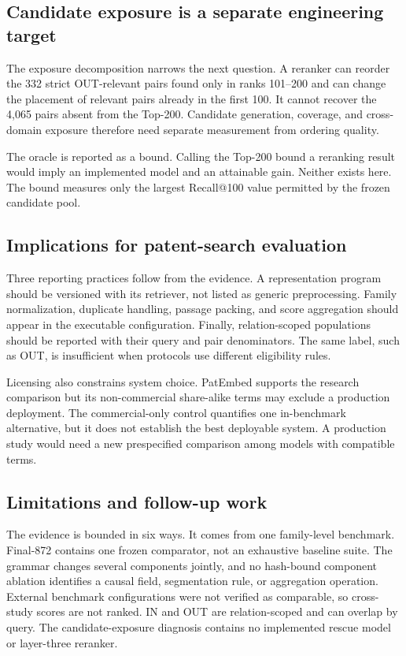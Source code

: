 \documentclass[final,5p,times,twocolumn]{elsarticle}
\begin{document}
\subsection{Candidate exposure is a separate engineering target}

The exposure decomposition narrows the next question. A reranker can reorder the
332 strict OUT-relevant pairs found only in ranks 101--200 and can change the
placement of relevant pairs already in the first 100. It cannot recover the
4,065 pairs absent from the Top-200. Candidate generation, coverage, and
cross-domain exposure therefore need separate measurement from ordering
quality.

The oracle is reported as a bound. Calling the Top-200 bound a reranking result
would imply an implemented model and an
attainable gain. Neither exists here. The bound measures only the largest
Recall@100 value permitted by the frozen candidate pool.

\subsection{Implications for patent-search evaluation}

Three reporting practices follow from the evidence. A representation program
should be versioned with its retriever, not listed as generic preprocessing.
Family normalization, duplicate handling, passage packing, and score
aggregation should appear in the executable configuration. Finally,
relation-scoped populations should be reported with their query and pair
denominators. The same label, such as OUT, is insufficient when protocols use
different eligibility rules.

Licensing also constrains system choice. PatEmbed supports the research
comparison but its non-commercial share-alike terms may exclude a production
deployment. The commercial-only control quantifies one in-benchmark
alternative, but it does not establish the best deployable system. A
production study would need a new prespecified comparison among models with
compatible terms.

\subsection{Limitations and follow-up work}

The evidence is bounded in six ways. It comes from one family-level benchmark.
Final-872 contains one frozen comparator, not an exhaustive baseline suite. The
grammar changes several components jointly, and no hash-bound component
ablation identifies a causal field, segmentation rule, or aggregation
operation. External benchmark configurations were not verified as comparable,
so cross-study scores are not ranked. IN and OUT are relation-scoped and can
overlap by query. The candidate-exposure diagnosis contains no implemented
rescue model or layer-three
reranker.
\end{document}
